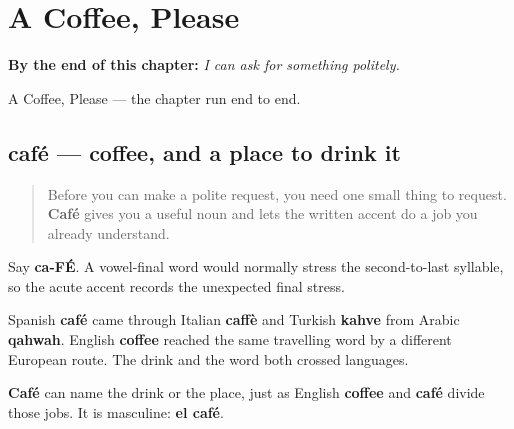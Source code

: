 
\chapter{A Coffee, Please}
\label{ch:a-coffee}

\begin{chapteropening}
\textbf{By the end of this chapter:} \emph{I can ask for something politely.}

A Coffee, Please — the chapter run end to end.
\end{chapteropening}

\section[café]{café — coffee, and a place to drink it}

\label{lesson:ES-C06-cafe}



\begin{quote}
Before you can make a polite request, you need one small thing to request. \textbf{Café} gives you a useful noun and lets the written accent do a job you already understand.
\end{quote}

\begin{sounds}
Say \textbf{ca-FÉ}. A vowel-final word would normally stress the second-to-last syllable, so the acute accent records the unexpected final stress.
\end{sounds}

\begin{cousinweb}
Spanish \textbf{café} came through Italian \textbf{caffè} and Turkish \textbf{kahve} from Arabic \textbf{qahwah}. English \textbf{coffee} reached the same travelling word by a different European route. The drink and the word both crossed languages.


\textbf{Café} can name the drink or the place, just as English \textbf{coffee} and \textbf{café} divide those jobs. It is masculine: \textbf{el café}.
\end{cousinweb}


